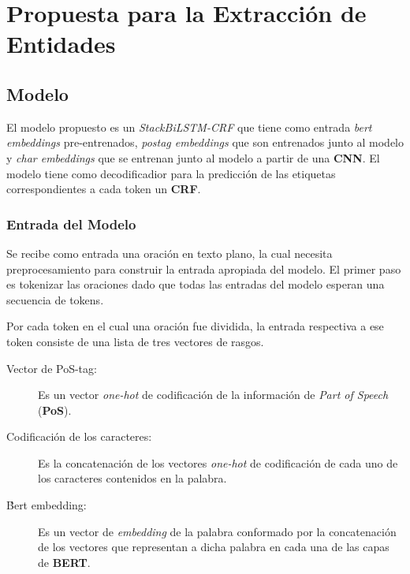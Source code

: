 \chapter{Propuesta para la Extracción de Entidades}\label{chapter:entities}


\section{Modelo}

El modelo propuesto es un \emph{StackBiLSTM-CRF} que tiene como entrada \emph{bert embeddings} pre-entrenados, \emph{postag embeddings} que son entrenados junto al modelo y \emph{char embeddings} que se entrenan junto al modelo a partir de una \textbf{CNN}. El modelo tiene como decodificadior para la predicci\'on de las etiquetas correspondientes a cada token un \textbf{CRF}.

\subsection{Entrada del Modelo}\label{sec:entrance}
Se recibe como entrada una oraci\'on en texto plano, la cual necesita preprocesamiento para construir la entrada apropiada del modelo. El primer paso es tokenizar las oraciones dado que todas las entradas del modelo esperan una secuencia de tokens.

Por cada token en el cual una oraci\'on fue dividida, la entrada respectiva a ese token consiste de una lista de tres vectores de rasgos.

\begin{description}
	\item[Vector de PoS-tag:] Es un vector \emph{one-hot} de codificaci\'on de la informaci\'on de \emph{Part of Speech} (\textbf{PoS}).
	\item[Codificaci\'on de los caracteres:] Es la concatenaci\'on de los vectores \emph{one-hot} de codificaci\'on de cada uno de los caracteres contenidos en la palabra. 
	\item[\'Bert embedding:] Es un vector de \emph{embedding} de la palabra conformado por la concatenaci\'on de los vectores que representan a dicha palabra en cada una de las capas de \textbf{BERT}.
	 
\end{description} 

